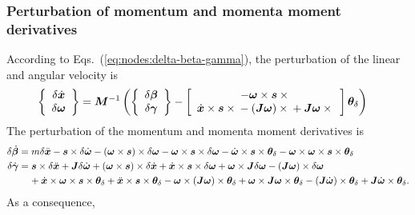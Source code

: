 \documentclass[10pt,fleqn,subeqn]{report}
\newcommand{\T}[1]{\bm{#1}}
\newcommand{\TT}[1]{\bm{#1}}
\begin{document}
\subsubsection{Perturbation of momentum and momenta moment derivatives}
According to Eqs.~(\ref{eq:nodes:delta-beta-gamma}),
the perturbation of the linear and angular velocity is
\begin{subequations}
\begin{align}
	\cubr{\cvvect{
		\delta\dot{\T{x}}
		\\
		\delta\T{\omega}
	}}
	&=
	\TT{M}^{-1} \plbr{
		\cubr{\cvvect{
			\delta\T{\beta}
			\\
			\delta\T{\gamma}
		}}
		-
		\sqbr{\cvvect{
			-\T{\omega} \times \T{s} \times{}
			\\
			\dot{\T{x}} \times \T{s} \times{}
			-
			\plbr{\TT{J} \T{\omega}} \times{}
			+
			\TT{J} \T{\omega} \times{}
		}} \T{\theta}_{\delta}
	}
\end{align}
\end{subequations}
The perturbation of the momentum and momenta moment derivatives is
\begin{subequations}
\begin{align}
	\delta\dot{\T{\beta}}
	&=
	m \delta\ddot{\T{x}}
	-
	\T{s} \times \delta\dot{\T{\omega}}
	-
	\plbr{\T{\omega} \times \T{s}} \times \delta \T{\omega}
	-
	\T{\omega} \times \T{s} \times \delta\T{\omega}
	-
	\dot{\T{\omega}} \times \T{s} \times \T{\theta}_{\delta}
	-
	\T{\omega} \times \T{\omega} \times \T{s} \times \T{\theta}_{\delta}
	\\
	\delta\dot{\T{\gamma}}
	&=
	\T{s} \times \delta\ddot{\T{x}}
	+
	\TT{J} \delta\dot{\T{\omega}}
	+
	\plbr{\T{\omega}\times \T{s}} \times \delta\dot{\T{x}}
	+
	\dot{\T{x}} \times \T{s} \times \delta\T{\omega}
	+
	\T{\omega} \times \TT{J} \delta\T{\omega}
	-
	\plbr{\TT{J} \T{\omega}} \times \delta\T{\omega}
	\nonumber \\ &\mbox{\hphantom{= }}
	+
	\dot{\T{x}} \times \T{\omega} \times \T{s} \times \T{\theta}_{\delta}
	+
	\ddot{\T{x}} \times \T{s} \times \T{\theta}_{\delta}
	-
	\T{\omega} \times \plbr{\TT{J} \T{\omega}} \times \T{\theta}_{\delta}
	+
	\T{\omega} \times \TT{J} \T{\omega} \times \T{\theta}_{\delta}
	-
	\plbr{\TT{J} \dot{\T{\omega}}} \times \T{\theta}_{\delta}
	+
	\TT{J} \dot{\T{\omega}} \times \T{\theta}_{\delta}
	.
\end{align}
\end{subequations}
As a consequence,
\end{document}
